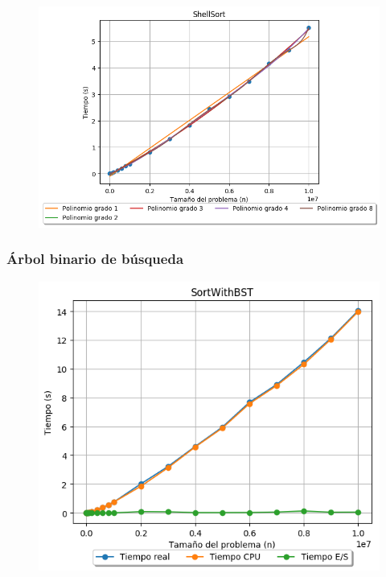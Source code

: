 \documentclass[12pt, fleqn]{report}                             %
\theoremstyle{break}                                            %
\begin{document}
    	        \begin{figure}[H]
    	            \centering
    	            \includegraphics[scale=0.86]{graphics/ShellSort-Polynomials.png}
    	        \end{figure}
    	        
    	    \subsubsection{Árbol binario de búsqueda}
    	        \begin{figure}[H]
    	            \centering
    	            \includegraphics[scale=0.86]{graphics/SortWithBST-ExperimentalTimes.png}
    	        \end{figure}
    	        
\end{document}
